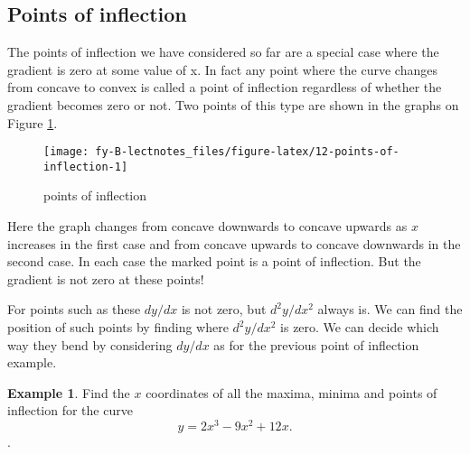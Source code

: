 \documentclass[
  11pt,
  oneside]{book}
\newcommand{\slide}{}
\theoremstyle{definition}
\theoremstyle{definition}
\newtheorem{example}{Example}[chapter]
\theoremstyle{definition}
\theoremstyle{definition}
\theoremstyle{remark}
\begin{document}
\slide

\subsection{Points of inflection}\label{points-of-inflection-1}

The points of inflection we have considered so far are a special case where the gradient is zero at
some value of x. In fact any point where the curve changes from concave to convex is called a
point of inflection regardless of whether the gradient becomes zero or not. Two points of this type
are shown in the graphs on Figure \ref{fig:12-points-of-inflection}.

\begin{figure}

{\centering \texttt{[image: fy-B-lectnotes\_files/figure-latex/12-points-of-inflection-1]} 

}

\caption{points of inflection}\label{fig:12-points-of-inflection}
\end{figure}

Here the graph changes from concave downwards to concave upwards as \(x\) increases in the first case and from concave upwards to concave downwards in the second case. In each case the marked point is a point of inflection. But the gradient is not zero at these points!

For points such as these \(dy/dx\) is not zero, but \(d^2y/dx^2\) always is. We can find the position of such points by finding where \(d^2y/dx^2\) is zero. We can decide which way they bend by considering \(dy/dx\) as for the previous point of inflection example.
\slide

\begin{example}
Find the \(x\) coordinates of all the maxima, minima and points of inflection for the curve
\[
y = 2x^3-9x^2+12x.
\].
\end{example}
\end{document}
